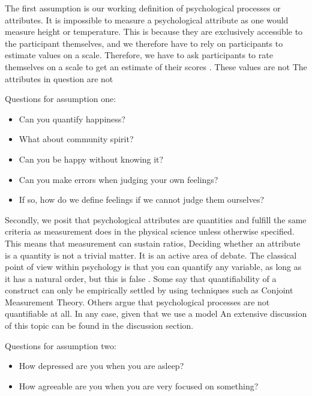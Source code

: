 \documentclass[utf8]{FrontiersinVancouver}
\begin{document}
The first assumption is our working definition of psychological processes or attributes. It is impossible to measure a psychological attribute as one would measure height or temperature. This is because they are exclusively accessible to the participant themselves, and we therefore have to rely on participants to estimate values on a scale. Therefore, we have to ask participants to rate themselves on a scale to get an estimate of their scores \citep{friedWhatArePsychological2017, maraunAugustinianMethodologicalFamily2009}. These values are not  The attributes in question are not 

\begin{framed} 
    Questions for assumption one:
    \begin{itemize}
        \item Can you quantify happiness?
        \item What about community spirit?
        \item Can you be happy without knowing it?
        \item Can you make errors when judging your own feelings?
        \item If so, how do we define feelings if we cannot judge them ourselves?
    \end{itemize}
\end{framed}

Secondly, we posit that psychological attributes are quantities and fulfill the same criteria as measurement does in the physical science unless otherwise specified. This means that measurement can sustain ratios,  Deciding whether an attribute is a quantity is not a trivial matter. It is an active area of debate. The classical point of view within psychology is that you can quantify any variable, as long as it has a natural order, but this is false \citep{michellMeasurementPsychologyCritical1999}. Some say that quantifiability of a construct can only be empirically settled by using techniques such as Conjoint Measurement Theory. Others argue that psychological processes are not quantifiable at all\citep{luceSimultaneousConjointMeasurement1964,michellMeasurementPsychologyCritical1999,trendlerConjointMeasurementUndone2019, michellConjointMeasurementUnderdone2019,franzArePsychologicalAttributes2022, tafreshiSenseNonsensePsychological2022}. In any case, given that we use a model  An extensive discussion of this topic can be found in the discussion section. 

\begin{framed}
    Questions for assumption two:
    \begin{itemize}
        \item How depressed are you when you are asleep?
        \item How agreeable are you when you are very focused on something?
    \end{itemize}
\end{framed}
\end{document}
